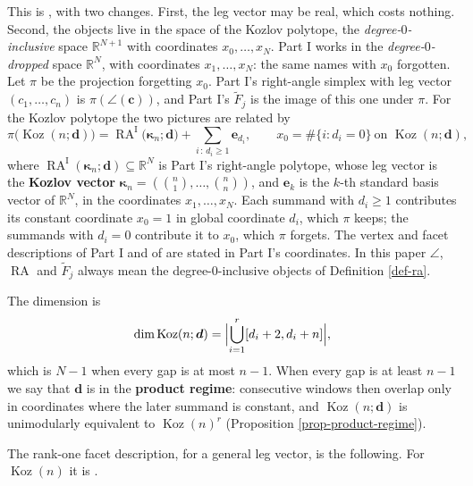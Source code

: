 \documentclass[11pt, a4paper, abstract=yes]{scrartcl}
\theoremstyle{definition}
\theoremstyle{remark}
\theoremstyle{plain}
\newcommand{\vek}[1]{\boldsymbol{#1}}
\theoremstyle{remark}
\theoremstyle{plain}
\newcommand{\Koz}{\operatorname{Koz}}
\newcommand{\rasimp}{\angle}
\newcommand{\RA}{\operatorname{RA}}
\newcommand{\kozvec}{\vek\kappa}
\begin{document}
This is \autocite[Definition 36]{SnellmanArticle1}, with two changes. First, the leg vector may be
real, which costs nothing. Second, the objects live in the space of the Kozlov polytope, the
\emph{degree-\(0\)-inclusive} space \(\mathbb R^{N+1}\) with coordinates \(x_0,\dots,x_N\). Part I works in
the \emph{degree-\(0\)-dropped} space \(\mathbb R^N\), with coordinates \(x_1,\dots,x_N\): the same names
with \(x_0\) forgotten. Let \(\pi\) be the projection forgetting \(x_0\). Part I's right-angle simplex
with leg vector \((c_1,\dots,c_n)\) is \(\pi(\rasimp(\vek c))\), and Part I's \(\tilde F_j\) is the
image of this one under \(\pi\). For the Kozlov polytope the two pictures are related by
\autocite[Section 8]{SnellmanArticle1}
\begin{equation}\label{eq:koz-as-ra}
  \pi\bigl(\Koz(n;\vek d)\bigr)=\RA^{\mathrm I}\bigl(\kozvec_n;\vek d\bigr)+\sum_{i\,:\,d_i\ge1}\vek e_{d_i},
  \qquad x_0=\#\lbrace i:d_i=0\rbrace\ \text{on }\Koz(n;\vek d),
\end{equation}
where \(\RA^{\mathrm I}(\kozvec_n;\vek d)\subseteq\mathbb R^N\) is Part I's right-angle polytope, whose
leg vector is the \textbf{Kozlov vector} \(\kozvec_n=(\binom n1,\dots,\binom nn)\), and \(\vek e_k\) is the
\(k\)-th standard basis vector of \(\mathbb R^N\), in the coordinates \(x_1,\dots,x_N\). Each summand
with \(d_i\ge1\) contributes its constant coordinate \(x_0=1\) in global coordinate \(d_i\), which
\(\pi\) keeps; the summands with \(d_i=0\) contribute it to \(x_0\), which \(\pi\) forgets. The vertex
and facet descriptions of Part I and of \autocite{SnellmanArticle4} are stated in Part I's coordinates.
In this paper \(\rasimp\), \(\RA\) and \(\tilde F_j\) always mean the degree-\(0\)-inclusive objects of
Definition \ref{def-ra}.

The dimension is \autocite[Proposition 45]{SnellmanArticle1}
\begin{equation}\label{eq:dim}
  \dim\Koz(n;\vek d)=\Bigl\lvert\bigcup_{i=1}^r[d_i+2,d_i+n]\Bigr\rvert ,
\end{equation}
which is \(N-1\) when every gap is at most \(n-1\). When
every gap is at least \(n-1\) we say that \(\vek d\) is in the \textbf{product regime}: consecutive windows
then overlap only in coordinates where the later summand is constant, and \(\Koz(n;\vek d)\) is
unimodularly equivalent to \(\Koz(n)^r\) (Proposition \ref{prop-product-regime}).

The rank-one facet description, for a general leg vector, is the following. For
\(\Koz(n)\) it is \autocite[Lemma 13 and Corollary 16]{SnellmanArticle1}.
\end{document}
